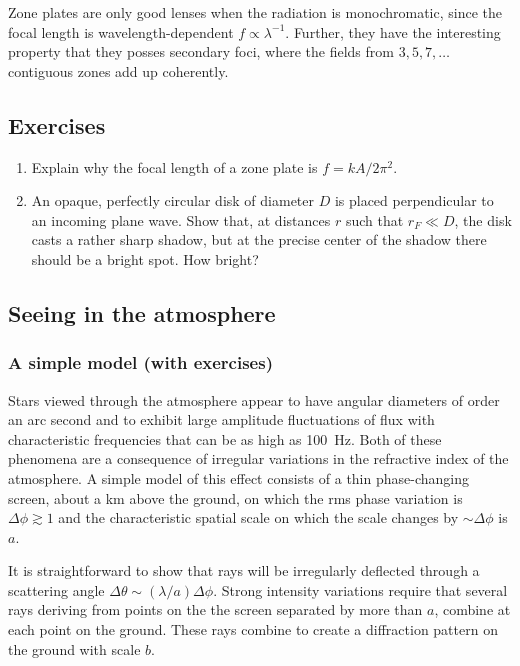 \documentclass{article}
\begin{document}
Zone plates are only good lenses when the radiation is monochromatic, since
the focal length is wavelength-dependent $f\propto \lambda^{-1}$. Further, they
have 
the interesting property that they posses secondary foci, where the fields from
$3,5,7,\ldots$ contiguous zones add up coherently.

\subsection*{Exercises}
\begin{enumerate}
\setcounter{enumi}{\value{count}}
\item Explain why the focal length of a zone plate is $f={kA/2\pi^2}$. 
\item An opaque, perfectly circular disk of diameter $D$ is placed perpendicular
to an incoming plane wave. Show that, at distances $r$ such that $r_F\ll D$, the
disk casts a rather sharp shadow, but at the precise center of the shadow there
should be a bright spot. How bright?
\setcounter{count}{\value{enumi}}
\end{enumerate}

\subsection{Seeing in the atmosphere}

\subsubsection{A simple model (with exercises)}

Stars viewed through the atmosphere appear to have angular diameters of 
order an arc second and to exhibit large amplitude fluctuations of flux with
characteristic frequencies that can be as high as 100~Hz. Both of these 
phenomena are a consequence of irregular variations in the refractive
index of the atmosphere. A simple model of this effect consists of a thin
phase-changing screen, about a km above the ground, on which the rms phase
variation is $\Delta\phi\gtrsim 1$ and the characteristic spatial scale on 
which the scale changes by $\sim\Delta\phi$ is $a$.

It is straightforward to show that rays will be irregularly deflected through
a scattering angle $\Delta\theta\sim({\lambda/a})\Delta\phi$. Strong 
intensity variations require that several rays deriving from points on the 
the screen separated by more than $a$, combine at each point on the ground.
These rays combine to create a diffraction pattern on the ground with
scale $b$. 
\end{document}
